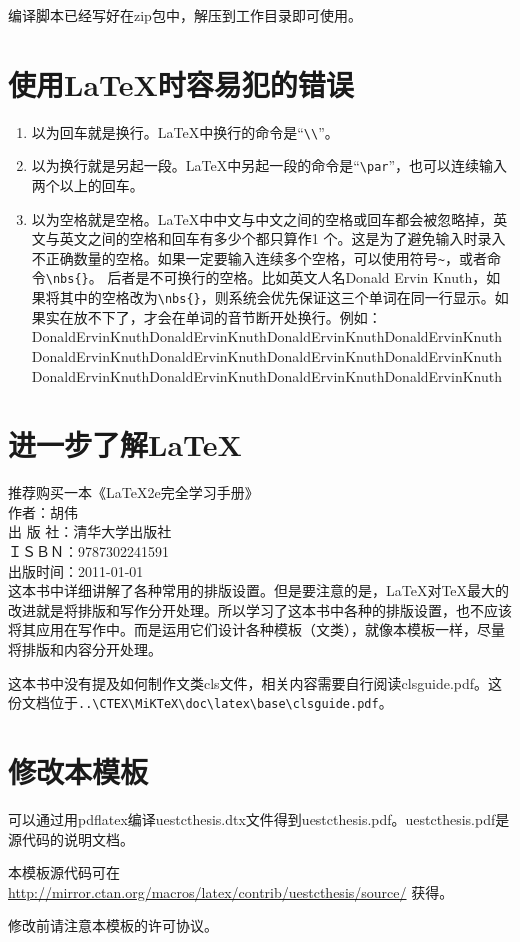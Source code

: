 编译脚本已经写好在zip包中，解压到工作目录即可使用。
\section{使用\LaTeX{}时容易犯的错误}
\begin{enumerate}
\item 以为回车就是换行。\LaTeX{}中换行的命令是“\verb|\\|”。
\item 以为换行就是另起一段。\LaTeX{}中另起一段的命令是“\verb|\par|”，也可以连续输入两个以上的回车。
\item 以为空格就是空格。\LaTeX{}中中文与中文之间的空格或回车都会被忽略掉，英文与英文之间的空格和回车有多少个都只算作1 个。这是为了避免输入时录入不正确数量的空格。如果一定要输入连续多个空格，可以使用符号\verb|~|，或者命令\verb|\nbs{}|。 后者是不可换行的空格。比如英文人名Donald Ervin Knuth，如果将其中的空格改为\verb|\nbs{}|，则系统会优先保证这三个单词在同一行显示。如果实在放不下了，才会在单词的音节断开处换行。例如：
    Donald\nbs{}Ervin\nbs{}Knuth\nbs{}Donald\nbs{}Ervin\nbs{}Knuth\nbs{}Donald\nbs{}Ervin\nbs{}Knuth\nbs{}Donald\nbs{}Ervin\nbs{}Knuth\nbs{}Donald\nbs{}Ervin\nbs{}Knuth\nbs{}Donald\nbs{}Ervin\nbs{}Knuth\nbs{}Donald\nbs{}Ervin\nbs{}Knuth\nbs{}Donald\nbs{}Ervin\nbs{}Knuth\nbs{}Donald\nbs{}Ervin\nbs{}Knuth\nbs{}Donald\nbs{}Ervin\nbs{}Knuth\nbs{}Donald\nbs{}Ervin\nbs{}Knuth\nbs{}Donald\nbs{}Ervin\nbs{}Knuth\nbs{}
\end{enumerate}

\section{进一步了解\LaTeX}
推荐购买一本《LaTeX2e完全学习手册》\\
作者：胡伟\\
出 版 社：清华大学出版社\\
ＩＳＢＮ：9787302241591 \\
出版时间：2011-01-01\\

这本书中详细讲解了各种常用的排版设置。但是要注意的是，\LaTeX{}对\TeX{}最大的改进就是将排版和写作分开处理。所以学习了这本书中各种的排版设置，也不应该将其应用在写作中。而是运用它们设计各种模板（文类），就像本模板一样，尽量将排版和内容分开处理。

这本书中没有提及如何制作文类cls文件，相关内容需要自行阅读clsguide.pdf。这份文档位于\verb|..\CTEX\MiKTeX\doc\latex\base\clsguide.pdf|。

\section{修改本模板}
可以通过用pdflatex编译uestcthesis.dtx文件得到uestcthesis.pdf。uestcthesis.pdf是源代码的说明文档。

本模板源代码可在\url{http://mirror.ctan.org/macros/latex/contrib/uestcthesis/source/} 获得。

修改前请注意本模板的许可协议。

